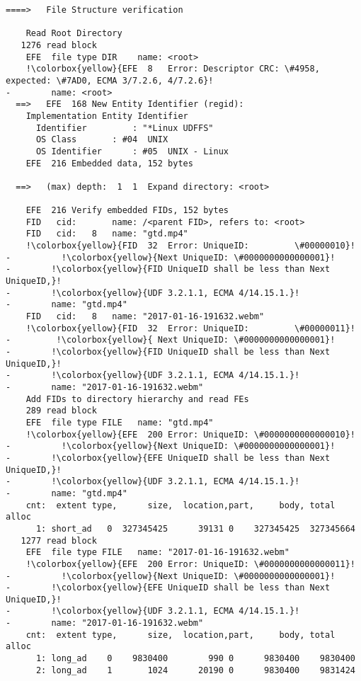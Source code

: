 \begin{lstlisting}
====>   File Structure verification

    Read Root Directory
   1276 read block
    EFE  file type DIR    name: <root>
    !\colorbox{yellow}{EFE  8   Error: Descriptor CRC: \#4958, expected: \#7AD0, ECMA 3/7.2.6, 4/7.2.6}!
-        name: <root>
  ==>   EFE  168 New Entity Identifier (regid):
    Implementation Entity Identifier
      Identifier         : "*Linux UDFFS"
      OS Class       : #04  UNIX
      OS Identifier      : #05  UNIX - Linux
    EFE  216 Embedded data, 152 bytes

  ==>   (max) depth:  1  1  Expand directory: <root>

    EFE  216 Verify embedded FIDs, 152 bytes
    FID   cid:       name: /<parent FID>, refers to: <root>
    FID   cid:   8   name: "gtd.mp4"
    !\colorbox{yellow}{FID  32  Error: UniqueID:         \#00000010}!
-          !\colorbox{yellow}{Next UniqueID: \#0000000000000001}!
-        !\colorbox{yellow}{FID UniqueID shall be less than Next UniqueID,}!
-        !\colorbox{yellow}{UDF 3.2.1.1, ECMA 4/14.15.1.}!
-        name: "gtd.mp4"
    FID   cid:   8   name: "2017-01-16-191632.webm"
    !\colorbox{yellow}{FID  32  Error: UniqueID:         \#00000011}!
-         !\colorbox{yellow}{ Next UniqueID: \#0000000000000001}!
-        !\colorbox{yellow}{FID UniqueID shall be less than Next UniqueID,}!
-        !\colorbox{yellow}{UDF 3.2.1.1, ECMA 4/14.15.1.}!
-        name: "2017-01-16-191632.webm"
    Add FIDs to directory hierarchy and read FEs
    289 read block
    EFE  file type FILE   name: "gtd.mp4"
    !\colorbox{yellow}{EFE  200 Error: UniqueID: \#0000000000000010}!
-          !\colorbox{yellow}{Next UniqueID: \#0000000000000001}!
-        !\colorbox{yellow}{EFE UniqueID shall be less than Next UniqueID,}!
-        !\colorbox{yellow}{UDF 3.2.1.1, ECMA 4/14.15.1.}!
-        name: "gtd.mp4"
    cnt:  extent type,      size,  location,part,     body, total alloc
      1: short_ad   0  327345425      39131 0    327345425  327345664
   1277 read block
    EFE  file type FILE   name: "2017-01-16-191632.webm"
    !\colorbox{yellow}{EFE  200 Error: UniqueID: \#0000000000000011}!
-          !\colorbox{yellow}{Next UniqueID: \#0000000000000001}!
-        !\colorbox{yellow}{EFE UniqueID shall be less than Next UniqueID,}!
-        !\colorbox{yellow}{UDF 3.2.1.1, ECMA 4/14.15.1.}!
-        name: "2017-01-16-191632.webm"
    cnt:  extent type,      size,  location,part,     body, total alloc
      1: long_ad    0    9830400        990 0      9830400    9830400
      2: long_ad    1       1024      20190 0      9830400    9831424


\end{lstlisting}
